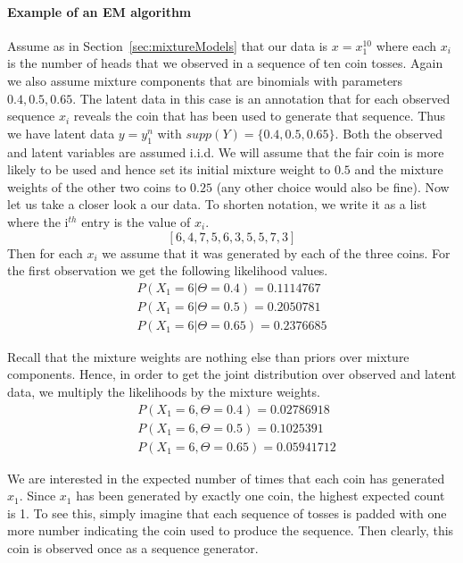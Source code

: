 \paragraph{Example of an EM algorithm} Assume as in Section~\ref{sec:mixtureModels} that our data is $ x=x^{10}_{1} $ where each $ x_{i} $ is the 
number of heads that we observed in a sequence of ten coin tosses. Again we also assume mixture components that are binomials with parameters
$ 0.4, 0.5, 0.65 $. The latent data in this case is an annotation that for each observed sequence $ x_{i} $ reveals the coin that has been used
to generate that sequence. Thus we have latent data $ y=y_{1}^{n} $ with $ supp(Y) = \{0.4,0.5,0.65\} $. Both the observed and latent variables
are assumed i.i.d.
We will assume that the fair coin is more likely to be used and hence set its initial mixture weight to $ 0.5 $ and the mixture weights of the 
other two coins to $ 0.25 $ (any other choice would also be fine). Now let 
us take a closer look a our data. To shorten notation, we write it as a list where the i$ ^{th} $ entry is the value of $ x_{i} $.
$$ [6, 4, 7, 5, 6, 3, 5, 5, 7, 3] $$
Then for each $ x_{i} $ we assume that it was generated by each of the three coins. For the first observation we get the following likelihood values.
\begin{align}
&P(X_{1}=6|\Theta=0.4) = 0.1114767& \\
&P(X_{1}=6|\Theta=0.5) = 0.2050781& \nonumber \\ 
&P(X_{1}=6|\Theta=0.65) = 0.2376685& \nonumber
\end{align}

Recall that the mixture weights are nothing else than priors over mixture components. Hence, in order to get the joint distribution over observed and
latent data, we multiply the likelihoods by the mixture weights.
\begin{align}
&P(X_{1}=6,\Theta=0.4) = 0.02786918 \\
&P(X_{1}=6,\Theta=0.5) = 0.1025391 \nonumber \\ 
&P(X_{1}=6,\Theta=0.65) = 0.05941712 \nonumber
\end{align}

We are interested in the expected number of times that each coin has generated $ x_{1} $. Since $ x_{1} $ has been generated by exactly one coin,
the highest expected count is 1. To see this, simply imagine that each sequence of tosses is padded with one more number indicating the coin
used to produce the sequence. Then clearly, this coin is observed once as a sequence generator.

